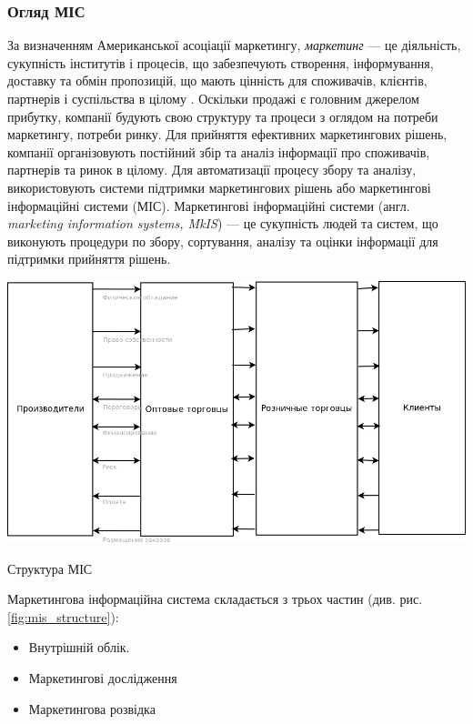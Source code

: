 \subsubsection{Огляд МІС} 
За визначенням Американської асоціації маркетингу, {\it маркетинг} --- це діяльність, сукупність інститутів і процесів, що забезпечують створення, інформування, доставку та обмін пропозицій, що мають цінність для споживачів, клієнтів, партнерів і суспільства в цілому \cite{kotler14}. Оскільки продажі є головним джерелом прибутку, компанії будують свою структуру та процеси з оглядом на потреби маркетингу, потреби ринку. Для прийняття ефективних маркетингових рішень, компанії організовують постійний збір та аналіз інформації про споживачів, партнерів та ринок в цілому. Для автоматизації процесу збору та аналізу, використовують системи підтримки маркетингових рішень або маркетингові інформаційні системи (МІС). Маркетингові інформаційні системи (англ. {\it marketing information systems, MkIS}) --- це сукупність людей та систем, що виконують процедури по збору, сортування, аналізу та оцінки інформації для підтримки прийняття рішень.

\begin{stdfigure}
\includegraphics[width=6in]{images/mis_structure.png}
\caption{Структура МІС}
\label{fig:mis_structure}
\end{stdfigure}
 
Маркетингова інформаційна система складається з трьох частин (див. рис. \ref{fig:mis_structure}): 
\begin{itemize}
\item Внутрішній облік.
\item Маркетингові дослідження
\item Маркетингова розвідка
\end{itemize}



